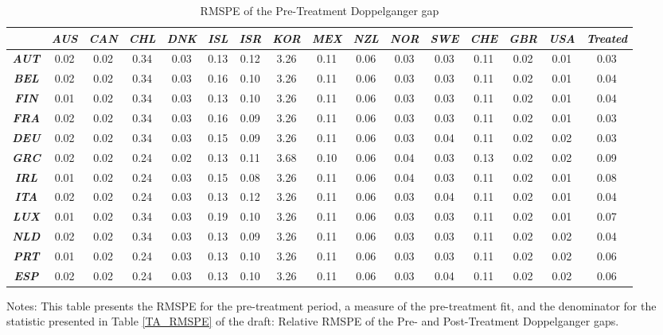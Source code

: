 \documentclass[12pt]{article}
\newcommand{\annote}[1]{\parbox{\textwidth}{\renewcommand{\baselinestretch}{1.0}\vspace{12pt} \small Notes: #1}}
\begin{document}
\begin{appendices}
\begin{landscape}
\begin{table}[h!]
\scriptsize
\caption{\label{TA_RMSPE_PRE} RMSPE of the Pre-Treatment Doppelganger gap}\centering
\begin{tabular}{c|cccccccccccccc|c} \toprule
                      & \textit{\textbf{AUS}} & \textit{\textbf{CAN}} & \textit{\textbf{CHL}} & \textit{\textbf{DNK}} & \textit{\textbf{ISL}} & \textit{\textbf{ISR}}  & \textit{\textbf{KOR}} & \textit{\textbf{MEX}} & \textit{\textbf{NZL}} & \textit{\textbf{NOR}} & \textit{\textbf{SWE}} & \textit{\textbf{CHE}} & \textit{\textbf{GBR}} & \textit{\textbf{USA}} & \textit{\textbf{Treated}} \\ \midrule
\textit{\textbf{AUT}} & 0.02 & 0.02 & 0.34 & 0.03 & 0.13 & 0.12 & 3.26 & 0.11 & 0.06 & 0.03 & 0.03 & 0.11 & 0.02 & 0.01 & 0.03  \\
\textit{\textbf{BEL}} & 0.02 & 0.02 & 0.34 & 0.03 & 0.16 & 0.10 & 3.26 & 0.11 & 0.06 & 0.03 & 0.03 & 0.11 & 0.02 & 0.01 & 0.04 \\
\textit{\textbf{FIN}} & 0.01 & 0.02 & 0.34 & 0.03 & 0.13 & 0.10 & 3.26 & 0.11 & 0.06 & 0.03 & 0.03 & 0.11 & 0.02 & 0.01 & 0.04 \\
\textit{\textbf{FRA}} & 0.02 & 0.02 & 0.34 & 0.03 & 0.16 & 0.09 & 3.26 & 0.11 & 0.06 & 0.03 & 0.03 & 0.11 & 0.02 & 0.01 & 0.03 \\
\textit{\textbf{DEU}} & 0.02 & 0.02 & 0.34 & 0.03 & 0.15 & 0.09 & 3.26 & 0.11 & 0.06 & 0.03 & 0.04 & 0.11 & 0.02 & 0.02 & 0.03 \\
\textit{\textbf{GRC}} & 0.02 & 0.02 & 0.24 & 0.02 & 0.13 & 0.11 & 3.68 & 0.10 & 0.06 & 0.04 & 0.03 & 0.13 & 0.02 & 0.02 & 0.09 \\
\textit{\textbf{IRL}} & 0.01 & 0.02 & 0.24 & 0.03 & 0.15 & 0.08 & 3.26 & 0.11 & 0.06 & 0.04 & 0.03 & 0.11 & 0.02 & 0.01 & 0.08 \\
\textit{\textbf{ITA}} & 0.02 & 0.02 & 0.24 & 0.03 & 0.13 & 0.12 & 3.26 & 0.11 & 0.06 & 0.03 & 0.04 & 0.11 & 0.02 & 0.01 & 0.04 \\
\textit{\textbf{LUX}} & 0.01 & 0.02 & 0.34 & 0.03 & 0.19 & 0.10 & 3.26 & 0.11 & 0.06 & 0.03 & 0.03 & 0.11 & 0.02 & 0.01 & 0.07  \\
\textit{\textbf{NLD}} & 0.02 & 0.02 & 0.34 & 0.03 & 0.13 & 0.09 & 3.26 & 0.11 & 0.06 & 0.03 & 0.03 & 0.11 & 0.02 & 0.02 & 0.04  \\
\textit{\textbf{PRT}} & 0.01 & 0.02 & 0.24 & 0.03 & 0.13 & 0.10 & 3.26 & 0.11 & 0.06 & 0.03 & 0.03 & 0.11 & 0.02 & 0.02 & 0.06 \\
\textit{\textbf{ESP}} & 0.02 & 0.02 & 0.24 & 0.03 & 0.13 & 0.10 & 3.26 & 0.11 & 0.06 & 0.03 & 0.04 & 0.11 & 0.02 & 0.02 & 0.06 \\
\bottomrule
\end{tabular}
\annote{This table presents the RMSPE for the pre-treatment period, a measure of the pre-treatment fit, and the denominator for the statistic presented in Table \ref{TA_RMSPE} of the draft: Relative RMSPE of the Pre- and Post-Treatment Doppelganger gaps.}
\end{table}


\end{landscape}
\end{appendices}
\end{document}
